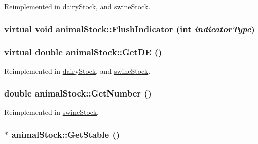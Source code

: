 Reimplemented in \hyperlink{classdairy_stock_a6650864514247ac49a701d3e40cdad9a}{dairyStock}, and \hyperlink{classswine_stock_ae8e9dfd9c03e9ba170c697f7376b82bd}{swineStock}.\hypertarget{classanimal_stock_a4801638201d8fa2c246eb4f9c28cf140}{
\subsubsection[{FlushIndicator}]{\setlength{\rightskip}{0pt plus 5cm}virtual void animalStock::FlushIndicator (int {\em indicatorType})}}
\label{classanimal_stock_a4801638201d8fa2c246eb4f9c28cf140}
\hypertarget{classanimal_stock_a8bed676752d1e6414c9a73fe72e3cb85}{
\subsubsection[{GetDE}]{\setlength{\rightskip}{0pt plus 5cm}virtual double animalStock::GetDE ()}}
\label{classanimal_stock_a8bed676752d1e6414c9a73fe72e3cb85}


Reimplemented in \hyperlink{classdairy_stock_aad94cb740f4ee70763adede5f4c4844c}{dairyStock}, and \hyperlink{classswine_stock_ac7b5455c4b474d3be67c17ce9d7f61ea}{swineStock}.\hypertarget{classanimal_stock_af2cf60cd12ce0376947bb5e5adab751d}{
\subsubsection[{GetNumber}]{\setlength{\rightskip}{0pt plus 5cm}double animalStock::GetNumber ()}}
\label{classanimal_stock_af2cf60cd12ce0376947bb5e5adab751d}


Reimplemented in \hyperlink{classswine_stock_a810cd4f4ffc068a42edf008b1288606d}{swineStock}.\hypertarget{classanimal_stock_ac12cce9260301cb684af03c4d101d3ca}{
\subsubsection[{GetStable}]{$\ast$ animalStock::GetStable ()}}
\label{classanimal_stock_ac12cce9260301cb684af03c4d101d3ca}


